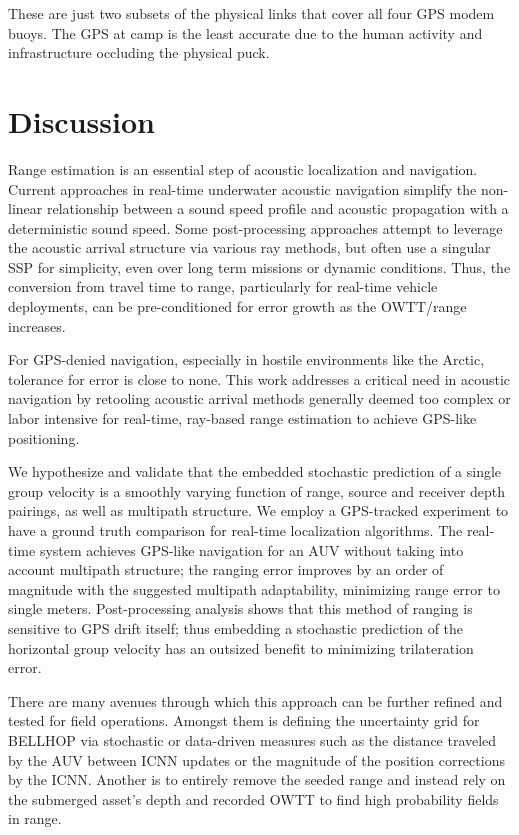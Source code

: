 These are just two subsets of the physical links that cover all four GPS modem buoys.
The GPS at camp is the least accurate due to the human activity and infrastructure occluding the physical puck.

\section{\label{sec:discussion} Discussion}

Range estimation is an essential step of acoustic localization and navigation.
Current approaches in real-time underwater acoustic navigation simplify the non-linear relationship between a sound speed profile and acoustic propagation with a deterministic sound speed.
Some post-processing approaches attempt to leverage the acoustic arrival structure via various ray methods, but often use a singular SSP for simplicity, even over long term missions or dynamic conditions.
Thus, the conversion from travel time to range, particularly for real-time vehicle deployments, can be pre-conditioned for error growth as the OWTT/range increases.

For GPS-denied navigation, especially in hostile environments like the Arctic, tolerance for error is close to none.
This work addresses a critical need in acoustic navigation by retooling acoustic arrival methods generally deemed too complex or labor intensive for real-time, ray-based range estimation to achieve GPS-like positioning.

We hypothesize and validate that the embedded stochastic prediction of a single group velocity is a smoothly varying function of range, source and receiver depth pairings, as well as multipath structure.
We employ a GPS-tracked experiment to have a ground truth comparison for real-time localization algorithms.
The real-time system achieves GPS-like navigation for an AUV without taking into account multipath structure; the ranging error improves by an order of magnitude with the suggested multipath adaptability, minimizing range error to single meters.
Post-processing analysis shows that this method of ranging is sensitive to GPS drift itself; thus embedding a stochastic prediction of the horizontal group velocity has an outsized benefit to minimizing trilateration error.

There are many avenues through which this approach can be further refined and tested for field operations.
Amongst them is defining the uncertainty grid for BELLHOP via stochastic or data-driven measures such as the distance traveled by the AUV between ICNN updates or the magnitude of the position corrections by the ICNN.
Another is to entirely remove the seeded range and instead rely on the submerged asset's depth and recorded OWTT to find high probability fields in range.

